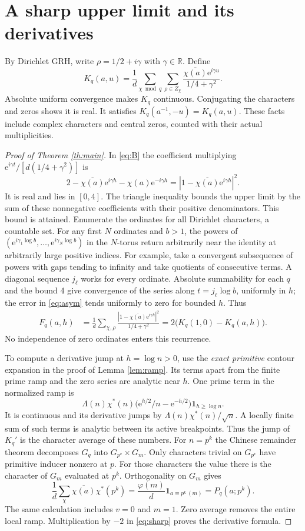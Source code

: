 \documentclass[11pt]{article}
\newcommand{\one}{\mathbf 1}
\newcommand{\R}{\mathbb R}
\newcommand{\e}{\mathrm e}
\begin{document}
\section{A sharp upper limit and its derivatives}
By Dirichlet GRH, write $\rho=1/2+i\gamma$ with $\gamma\in\R$. Define
\[
 K_q(a,u)=\frac1d\sum_{\chi\bmod q}\sum_{\rho\in Z_\chi}
       \frac{\overline{\chi(a)}\e^{i\gamma u}}{1/4+\gamma^2}.
\]
Absolute uniform convergence makes $K_q$ continuous. Conjugating the characters and zeros shows it is real. It satisfies $K_q(a^{-1},-u)=K_q(a,u)$. These facts include complex characters and central zeros, counted with their actual multiplicities.

\begin{proof}[Proof of Theorem \ref{th:main}]
In \eqref{eq:B} the coefficient multiplying $\e^{i\gamma t}/[d(1/4+\gamma^2)]$ is
\[
 2-\overline{\chi(a)}\e^{i\gamma h}-\chi(a)\e^{-i\gamma h}
       =|1-\overline{\chi(a)}\e^{i\gamma h}|^2 .
\]
It is real and lies in $[0,4]$. The triangle inequality bounds the upper limit by the sum of these nonnegative coefficients with their positive denominators. This bound is attained. Enumerate the ordinates for all Dirichlet characters, a countable set. For any first $N$ ordinates and $b>1$, the powers of $(\e^{i\gamma_1\log b},\ldots,\e^{i\gamma_N\log b})$ in the $N$-torus return arbitrarily near the identity at arbitrarily large positive indices. For example, take a convergent subsequence of powers with gaps tending to infinity and take quotients of consecutive terms. A diagonal sequence $j_\ell$ works for every ordinate. Absolute summability for each $q$ and the bound 4 give convergence of the series along $t=j_\ell\log b$, uniformly in $h$; the error in \eqref{eq:asym} tends uniformly to zero for bounded $h$. Thus
\begin{align}
 F_q(a,h)
 &=\frac1d\sum_{\chi,\rho}
   \frac{|1-\overline{\chi(a)}\e^{i\gamma h}|^2}{1/4+\gamma^2}
 =2\bigl(K_q(1,0)-K_q(a,h)\bigr).\label{eq:sharp}
\end{align}
No independence of zero ordinates enters this recurrence.

To compute a derivative jump at $h=\log n>0$, use the \emph{exact primitive} contour expansion in the proof of Lemma \ref{lem:ramp}. Its terms apart from the finite prime ramp and the zero series are analytic near $h$. One prime term in the normalized ramp is
\[
 \Lambda(n)\chi^*(n)\bigl(\e^{h/2}/n-\e^{-h/2}\bigr)\one_{h\ge\log n}.
\]
It is continuous and its derivative jumps by $\Lambda(n)\chi^*(n)/\sqrt n$. A locally finite sum of such terms is analytic between its active breakpoints. Thus the jump of $K_q'$ is the character average of these numbers. For $n=p^k$ the Chinese remainder theorem decomposes $G_q$ into $G_{p^v}\times G_m$. Only characters trivial on $G_{p^v}$ have primitive inducer nonzero at $p$. For those characters the value there is the character of $G_m$ evaluated at $p^k$. Orthogonality on $G_m$ gives
\[
 \frac1d\sum_{\chi}\overline{\chi(a)}\chi^*(p^k)
   =\frac{\varphi(m)}{d}\one_{a\equiv p^k\, (m)}=P_q(a;p^k).
\]
The same calculation includes $v=0$ and $m=1$. Zero average removes the entire local ramp. Multiplication by $-2$ in \eqref{eq:sharp} proves the derivative formula.
\end{proof}
\end{document}
